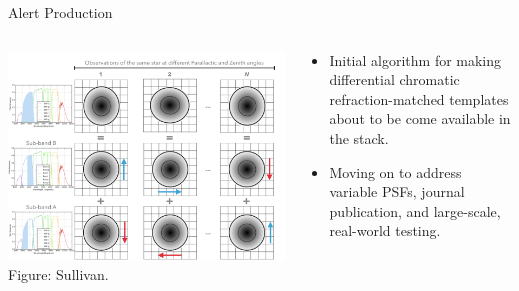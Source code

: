 \begin{frame}{Alert Production}
{\begin{columns}
    \begin{column}{0.25\textwidth}
      \vspace{-0.5cm}
      \begin{center}
        \includegraphics[width=1.0\textwidth]{figures/dcr.png}\\
        \tiny Figure: Sullivan.
      \end{center}
    \end{column}

    \begin{column}{0.75\textwidth}
      \begin{itemize}
        \item{Initial algorithm for making differential chromatic
        refraction-matched templates about to be come available in the stack.}
        \item{Moving on to address variable PSFs, journal publication, and
        large-scale, real-world testing.}
      \end{itemize}
    \end{column}
  \end{columns}
}
\end{frame}

